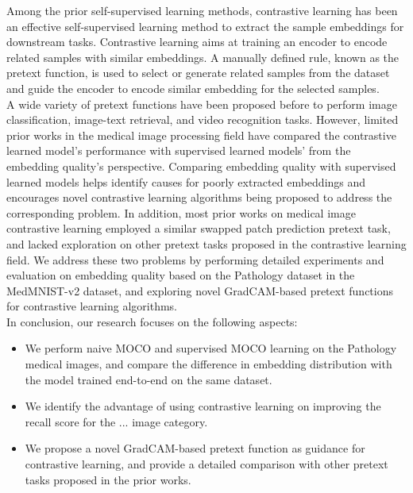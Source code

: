 \documentclass[12pt,twoside]{report}
\begin{document}
Among the prior self-supervised learning methods, contrastive learning has been an effective self-supervised learning method to extract the sample embeddings for downstream tasks. Contrastive learning aims at training an encoder to encode related samples with similar embeddings. A manually defined rule, known as the pretext function, is used to select or generate related samples from the dataset and guide the encoder to encode similar embedding for the selected samples. \\

A wide variety of pretext functions have been proposed before to perform image classification, image-text retrieval, and video recognition tasks. However, limited prior works in the medical image processing field have compared the contrastive learned model's performance with supervised learned models' from the embedding quality's perspective. Comparing embedding quality with supervised learned models helps identify causes for poorly extracted embeddings and encourages novel contrastive learning algorithms being proposed to address the corresponding problem. In addition, most prior works on medical image contrastive learning employed a similar swapped patch prediction pretext task, and lacked exploration on other pretext tasks proposed in the contrastive learning field. We address these two problems by performing detailed experiments and evaluation on embedding quality based on the Pathology dataset in the MedMNIST-v2 dataset, and exploring novel GradCAM-based pretext functions for contrastive learning algorithms. \\



In conclusion, our research focuses on the following aspects: 
\begin{itemize}
    \item We perform naive MOCO and supervised MOCO learning on the Pathology medical images, and compare the difference in embedding distribution with the model trained end-to-end on the same dataset. 
    \item We identify the advantage of using contrastive learning on improving the recall score for the ... image category. 
    \item We propose a novel GradCAM-based pretext function as guidance for contrastive learning, and provide a detailed comparison with other pretext tasks proposed in the prior works. 
\end{itemize}
\end{document}
